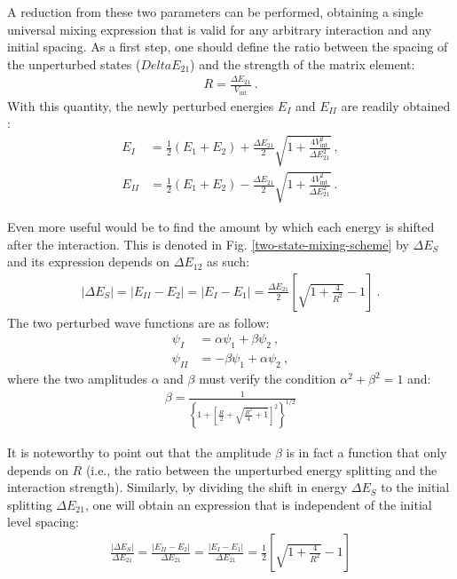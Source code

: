 A reduction from these two parameters can be performed, obtaining a single universal mixing expression that is valid for any arbitrary interaction and any initial spacing. As a first step, one should define the ratio between the spacing of the unperturbed states ($Delta E_{21}$) and the strength of the matrix element:
\begin{align}
    R=\frac{\Delta E_{21}}{V_\text{int}}\ .
\end{align}
With this quantity, the newly perturbed energies $E_I$ and $E_{II}$ are readily obtained \cite{casten2000nuclear}:
\begin{align}
    E_I&=\frac{1}{2}(E_1+E_2)+\frac{\Delta E_{21}}{2}\sqrt{1+\frac{4V_\text{int}^2}{\Delta E_{21}^2}}\ ,\\
    E_{II}&=\frac{1}{2}(E_1+E_2)-\frac{\Delta E_{21}}{2}\sqrt{1+\frac{4V_\text{int}^2}{\Delta E_{21}^2}}\ .
\end{align}

Even more useful would be to find the amount by which each energy is shifted after the interaction. This is denoted in Fig. \ref{two-state-mixing-scheme} by $\Delta E_S$ and its expression depends on $\Delta E_{12}$ as such:
\begin{align}
    |\Delta E_S|=|E_{II}-E_2|=|E_{I}-E_1|=\frac{\Delta E_{21}}{2}\left[\sqrt{1+\frac{4}{R^2}}-1\right]\ .
\end{align}
The two perturbed wave functions are as follow:
\begin{align}
    \psi_I&=\alpha\psi_1+\beta\psi_2\ ,\nonumber\\
    \psi_{II}&=-\beta\psi_1+\alpha\psi_2\ ,
\end{align}
where the two amplitudes $\alpha$ and $\beta$ must verify the condition $\alpha^2+\beta^2=1$ and:
\begin{align}
    \beta=\frac{1}{\left\{1+\left[\frac{R}{2}+\sqrt{\frac{R^2}{4}+1}\right]^2\right\}^{1/2}}
    \label{eq-beta-mixing-amplitude}
\end{align}

It is noteworthy to point out that the amplitude $\beta$ is in fact a function that only depends on $R$ (i.e., the ratio between the unperturbed energy splitting and the interaction strength). Similarly, by dividing the shift in energy $\Delta E_S$ to the initial splitting $\Delta E_{21}$, one will obtain an expression that is independent of the initial level spacing:
\begin{align}
    \frac{|\Delta E_S|}{\Delta E_{21}}=\frac{|E_{II}-E_{2}|}{\Delta E_{21}}=\frac{|E_{I}-E_{1}|}{\Delta E_{21}}=\frac{1}{2}\left[\sqrt{1+\frac{4}{R^2}}-1\right]
\end{align}

